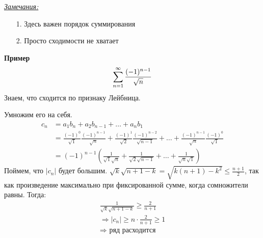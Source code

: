 \underline{\textit{Замечания:}}
\begin{enumerate}
    \item[1.] Здесь важен порядок суммирования
    \item[2.] Просто сходимости не хватает 
\end{enumerate}

\textbf{Пример}
\begin{equation*}
    \sum \limits_{n=1}^\infty \frac{(-1)^{n-1}}{\sqrt{n}}
\end{equation*}
Знаем, что сходится по признаку Лейбница.

Умножим его на себя. 
\begin{align*}
    c_n &= a_1b_n + a_2b_{n-1} + \ldots + a_nb_1 \\
    &= \frac{(-1)^0}{\sqrt{1}} \frac{(-1)^{n-1}}{\sqrt{n}} + 
    \frac{(-1)^1}{\sqrt{2}}\frac{(-1)^{n-2}}{\sqrt{n-1}} + \ldots +
    \frac{(-1)^{n-1}}{\sqrt{n}}\frac{(-1)^0}{\sqrt{1}} \\
    &= (-1)^{n-1} (\frac{1}{\sqrt{1}\sqrt{n}} + 
    \frac{1}{\sqrt{2}\sqrt{n-1}} + \ldots + \frac{1}{\sqrt{n}\sqrt{1}})
\end{align*}
Поймем, что $|c_n|$ будет большим. $\sqrt{k}\sqrt{n+1-k} = \sqrt{k(n+1)-k^2} \leq \frac{n+1}{2}$, 
так как произведение максимально при фиксированной сумме, когда сомножители равны.
Тогда:
\begin{gather*}
    \frac{1}{\sqrt{k}\sqrt{n+1-k}} \geq \frac{2}{n+1} \\
    \Longrightarrow |c_n| \geq n \cdot \frac{2}{n+1} \geq 1 \\
    \Longrightarrow \text{ ряд расходится}
\end{gather*}